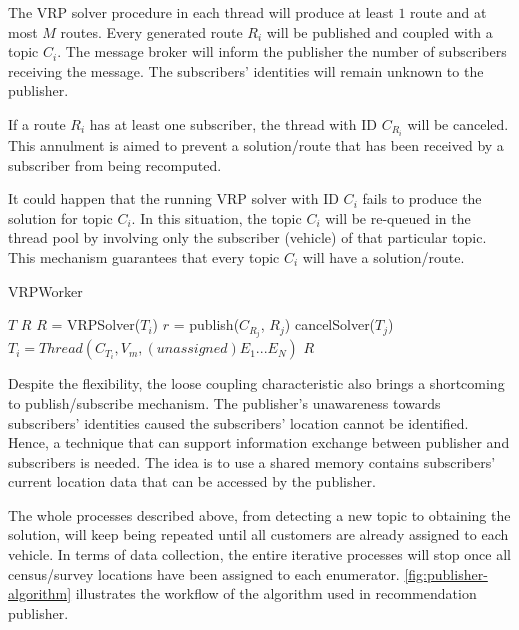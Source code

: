 \documentclass[conference]{IEEEtran}
\begin{document}
The VRP solver procedure in each thread will produce at least $1$ route and at most $M$ routes. Every generated route $R_i$ will be published and coupled with a topic $C_i$. The message broker will inform the publisher the number of subscribers receiving the message. The subscribers' identities will remain unknown to the publisher. 


If a route $R_i$ has at least one subscriber, the thread with ID $C_{R_i}$ will be canceled. This annulment is aimed to prevent a solution/route that has been received by a subscriber from being recomputed. 


It could happen that the running VRP solver with ID $C_i$ fails to produce the solution for topic $C_i$. In this situation, the topic $C_i$ will be re-queued in the thread pool by involving only the subscriber (vehicle) of that particular topic. This mechanism guarantees that every topic $C_i$ will have a solution/route. 


\begin{algorithm}[!]
	\caption{VRPWorker}
	\label{alg:vrp-worker}
	\begin{algorithmic}[1]
		\renewcommand{\algorithmicrequire}{\textbf{Input:}}
		\renewcommand{\algorithmicensure}{\textbf{Output:}}
		\REQUIRE $T$
		\ENSURE  $R$
			\STATE $R$ = VRPSolver($T_i$)
				\STATE $r$ = publish($C_{R_j}$, $R_j$)
					\STATE cancelSolver($T_j$)
					\STATE $T_i = Thread(C_{T_i}, V_m, (unassigned) E_1...E_N)$
				\ENDIF
			\ENDFOR
		\ENDFOR
		\RETURN $R$
	\end{algorithmic}
\end{algorithm}


Despite the flexibility, the loose coupling characteristic also brings a shortcoming to publish/subscribe mechanism. The publisher's unawareness towards subscribers' identities caused the subscribers' location cannot be identified. Hence, a technique that can support information exchange between publisher and subscribers is needed. The idea is to use a shared memory contains subscribers' current location data that can be accessed by the publisher. 

The whole processes described above, from detecting a new topic to obtaining the solution, will keep being repeated until all customers are already assigned to each vehicle. In terms of data collection, the entire iterative processes will stop once all census/survey locations have been assigned to each enumerator. \autoref{fig:publisher-algorithm} illustrates the workflow of the algorithm used in recommendation publisher.
\end{document}
